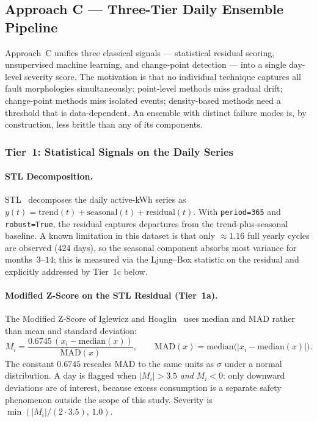 \documentclass[11pt]{article}
\begin{document}
\subsection{Approach C --- Three-Tier Daily Ensemble Pipeline}
\label{subsec:approachC}

Approach~C unifies three classical signals --- statistical residual scoring, unsupervised machine learning, and change-point detection --- into a single day-level severity score. The motivation is that no individual technique captures all fault morphologies simultaneously: point-level methods miss gradual drift; change-point methods miss isolated events; density-based methods need a threshold that is data-dependent. An ensemble with distinct failure modes is, by construction, less brittle than any of its components.

\subsubsection*{Tier~1: Statistical Signals on the Daily Series}

\paragraph{STL Decomposition.}
STL~\cite{cleveland1990stl} decomposes the daily active-kWh series as
$y(t) = \mathrm{trend}(t) + \mathrm{seasonal}(t) + \mathrm{residual}(t)$.
With \texttt{period=365} and \texttt{robust=True}, the residual captures departures from the trend-plus-seasonal baseline. A known limitation in this dataset is that only $\approx 1.16$ full yearly cycles are observed ($424$ days), so the seasonal component absorbs most variance for months~$3$--$14$; this is measured via the Ljung--Box statistic on the residual and explicitly addressed by Tier~1c below.

\paragraph{Modified Z-Score on the STL Residual (Tier~1a).}
The Modified Z-Score of Iglewicz and Hoaglin~\cite{iglewicz1993outliers} uses median and MAD rather than mean and standard deviation:
\[
  M_i = \frac{0.6745\,(x_i - \mathrm{median}(x))}{\mathrm{MAD}(x)},
  \qquad
  \mathrm{MAD}(x) = \mathrm{median}\bigl(\lvert x_i - \mathrm{median}(x)\rvert\bigr).
\]
The constant $0.6745$ rescales MAD to the same units as $\sigma$ under a normal distribution. A day is flagged when $|M_i| > 3.5$ \emph{and} $M_i < 0$: only downward deviations are of interest, because excess consumption is a separate safety phenomenon outside the scope of this study. Severity is $\min(|M_i|/(2 \cdot 3.5),\,1.0)$.
\end{document}

